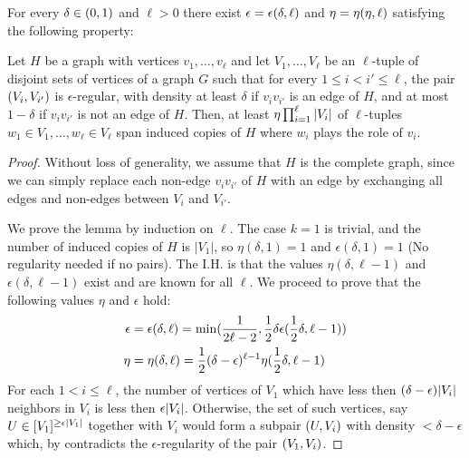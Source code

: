         \begin{lemma} \label{lem:H_like_partition_implies_H_abundance}
            For every $\delta \in ( 0, 1 )$ and $\ell > 0$ there exist $\epsilon = \epsilon ( \delta, \ell )$ and
            $\eta = \eta ( \eta, \ell )$ satisfying the following property:

            Let $H$ be a graph with vertices $v_1, \dots,v_\ell$ and let $V_1, \dots, V_\ell$ be an $\ell$-tuple of disjoint
            sets of vertices of a graph $G$ such that for every $1 \leq i < i' \leq \ell$, the pair $( V_i, V_{i'} )$
            is $\epsilon$-regular, with density at least $\delta$ if $v_i v_{i'}$ is an edge of $H$, and at most $1 - \delta$
            if $v_i v_{i'}$ is not an edge of $H$.
            Then, at least $\eta \prod_{i=1}^\ell | V_i |$ of $\ell$-tuples $w_1 \in V_1, \dots, w_\ell \in V_\ell$
            span induced copies of $H$ where $w_i$ plays the role of $v_i$.
            \begin{proof}
                Without loss of generality, we assume that $H$ is the complete graph, since we can simply replace each non-edge
                $v_i v_{i'}$ of $H$ with an edge by exchanging all edges and non-edges between $V_i$ and $V_{i'}$.

                We prove the lemma by induction on $\ell$.
                The case $k=1$ is trivial, and the number of induced copies of $H$ is $|V_1|$, so $\eta(\delta, 1) = 1$ and
                $\epsilon(\delta, 1) = 1$ (No regularity needed if no pairs).
                The I.H. is that the values $\eta(\delta, \ell-1)$ and $\epsilon(\delta, \ell-1)$ exist and are known for all
                $\ell$.
                We proceed to prove that the following values $\eta$ and $\epsilon$ hold:
                \begin{align*}
                    \epsilon &= \epsilon(\delta, \ell)
                        = \min ( \frac{1}{2\ell - 2}, \frac{1}{2} \delta \epsilon(\frac{1}{2}\delta, \ell-1) ) \\
                    \eta &= \eta(\delta, \ell)
                        = \frac{1}{2} (\delta - \epsilon)^{\ell-1} \eta(\frac{1}{2}\delta, \ell-1)
                \end{align*}
                For each $1 < i \leq \ell$, the number of vertices of $V_1$ which have less then
                $(\delta - \epsilon) | V_i |$ neighbors in $V_i$ is less then $\epsilon | V_i |$.
                Otherwise, the set of such vertices, say $U \in [V_1]^{\geq \epsilon | V_1 |}$ together with $V_i$
                would form a subpair $( U, V_i )$ with density $< \delta - \epsilon$ which, by
                 contradicts the $\epsilon$-regularity of the pair $( V_1, V_i )$.


\end{proof}
\end{lemma}
